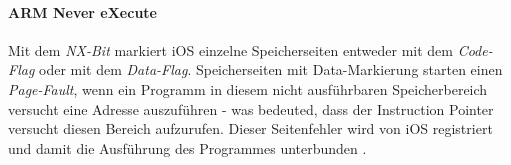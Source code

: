 		\paragraph{ARM Never eXecute}
			Mit dem \textsl{NX-Bit} markiert iOS einzelne Speicherseiten entweder mit dem
			\textsl{Code-Flag} oder mit dem \textsl{Data-Flag}. Speicherseiten mit
			Data-Markierung starten einen \textsl{Page-Fault}, wenn ein Programm in
			diesem nicht ausführbaren Speicherbereich versucht eine Adresse auszuführen
			- was bedeuted, dass der Instruction Pointer versucht diesen Bereich
			aufzurufen. Dieser Seitenfehler wird von iOS registriert und damit die
			Ausführung des Programmes unterbunden \cite[S. 310]{Levin2012}.